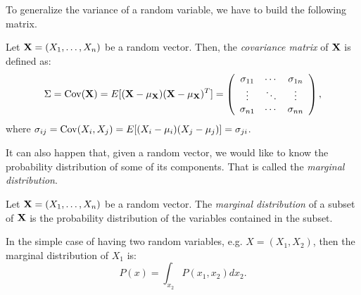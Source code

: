 To generalize the variance of a random variable, we have to build the following matrix.

\begin{ndef}
Let $\mathbf{X} = (X_1,\dots,X_n)$ be a random vector. Then, the \emph{covariance matrix} of $\mathbf{X}$ is defined as:
$$
\Sigma = \operatorname*{Cov}(\mathbf{X}) = E[(\mathbf{X} - \mu_{\mathbf{X}})(\mathbf{X} - \mu_{\mathbf{X}})^T] = \left ( \begin{array}{ccc} 
  \sigma_{11} & \cdots & \sigma_{1n}\\
  \vdots & \ddots & \vdots \\
  \sigma_{n1} & \cdots & \sigma_{nn}
  \end{array} \right ),
$$
where $\sigma_{ij} = \operatorname*{Cov}(X_i,X_j) = E[(X_i - \mu_i)(X_j - \mu_j)] = \sigma_{ji}$.
\end{ndef}


It can also happen that, given a random vector, we would like to know the probability distribution of some of its components. That is called the \emph{marginal distribution}.

\begin{ndef}
Let $\mathbf{X} = (X_1,\dots,X_n)$ be a random vector. The \emph{marginal distribution} of a subset of $\mathbf{X}$ is the probability distribution of the variables contained in the subset. 
\end{ndef}
In the simple case of having two random variables, e.g. $X= (X_1, X_2)$, then the marginal distribution of $X_1$ is:
$$
P(x) = \int_{x_2} P(x_1,x_2) dx_2.
$$

